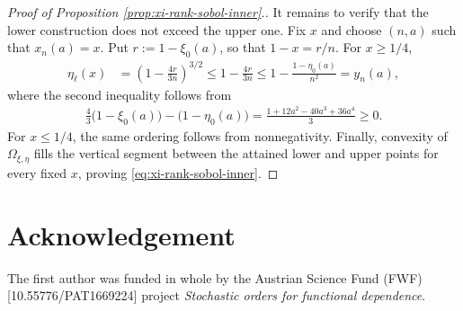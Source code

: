 \documentclass{article}
\begin{document}
\begin{proof}[Proof of Proposition \ref{prop:xi-rank-sobol-inner}.]
It remains to verify that the lower construction does not exceed the upper one.
Fix \(x\) and choose \((n,a)\) such that \(x_n(a)=x\).
Put \(r:=1-\xi_0(a)\), so that \(1-x=r/n\).
For \(x\geq1/4\),
\begin{align*}
    \eta_\ell(x)
    &=
    \left(1-\frac{4r}{3n}\right)^{3/2}
    \leq
    1-\frac{4r}{3n}
    \leq
    1-\frac{1-\eta_0(a)}{n^2}
    =
    y_n(a),
\end{align*}
where the second inequality follows from
\begin{align*}
    \frac43\bigl(1-\xi_0(a)\bigr)
    -
    \bigl(1-\eta_0(a)\bigr)
    =
    \frac{1+12a^2-40a^3+36a^4}{3}
    \geq0.
\end{align*}
For \(x\leq1/4\), the same ordering follows from nonnegativity.
Finally, convexity of \(\Omega_{\xi,\eta}\) fills the vertical segment between the attained lower and upper points for every fixed \(x\), proving \eqref{eq:xi-rank-sobol-inner}.
\end{proof}



\section*{Acknowledgement}

The first author was funded in whole by the Austrian Science Fund (FWF) {[10.55776/PAT1669224]} project \emph{Stochastic orders for functional dependence}.






\end{document}
